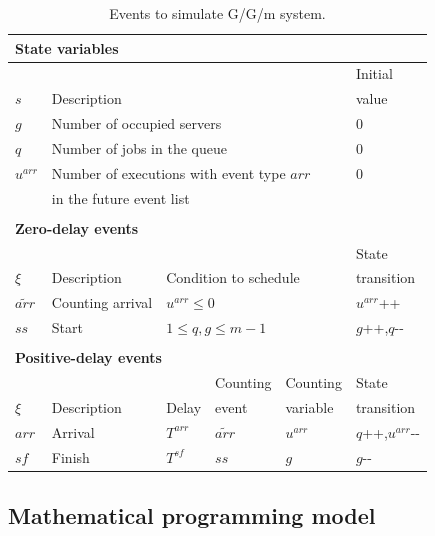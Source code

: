 \documentclass[suppldata]{interact}
\theoremstyle{plain}
\theoremstyle{definition}
\theoremstyle{remark}
\begin{document}
\begin{table}[h]
	\begin{tabular}{llllll}
		\multicolumn{6}{l}{\textbf{State variables}}\\ \hline
		&&&&& Initial\\
		$s$ & \multicolumn{4}{l}{Description}& value\\\hline
		$g$& \multicolumn{4}{l}{Number of occupied servers}  & 0 \\
		$q$ & \multicolumn{4}{l}{Number of jobs in the queue} &0\\
		$u^{arr}$& \multicolumn{4}{l}{Number of executions with event type $arr$ }  &0\\
		&\multicolumn{4}{l}{in the future event list}& \\
		&&&&&\\
		\multicolumn{6}{l}{\textbf{Zero-delay events}}\\ \hline
		&&&&& State\\
		$\xi$&Description &  \multicolumn{3}{l}{Condition to schedule}& transition\\\hline%
		${\tilde{arr}}$ & Counting arrival&  \multicolumn{3}{l}{$u^{arr}\le0$} & $u^{arr}${\footnotesize++} \\
		${ss}$& Start 	& \multicolumn{3}{l}{$1\le q, g\le m-1$} & $g${\footnotesize++},$q${\small-}{\small-}  \\
		&&&&&\\
		\multicolumn{6}{l}{\textbf{Positive-delay events}}\\ \hline
		&&& Counting& Counting  & State \\
		$\xi$&Description & Delay &  event& variable & transition\\\hline
		${arr}$& Arrival & $T^{arr}$& ${\tilde{arr}}$& $u^{arr}$ & $q${\footnotesize++},$u^{arr}${\small-}{\small-} \\	
		${sf}$& Finish & $T^{sf}$& ${ss}$& $g$  & $g${\small-}{\small-} \\\hline
	\end{tabular}
	\caption{Events to simulate G/G/m system.}
	\label{tab:ggm_1}
\end{table}



\subsection{Mathematical programming model}
\end{document}
